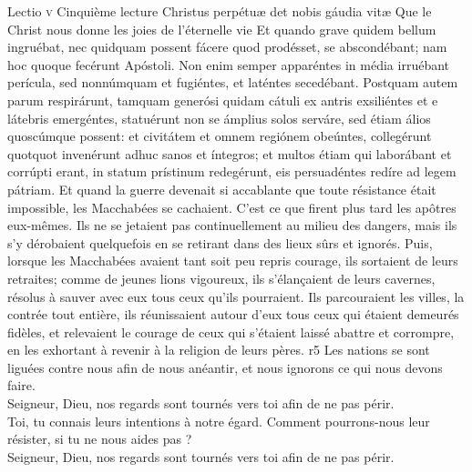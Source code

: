 \documentclass[twoside]{article}
\begin{document}
\begin{paracol}[1]{2}
\lectioresponsorium
	{Lectio \textsc{v}}
	{Cinquième lecture}
	{Christus perpétuæ det nobis gáudia vitæ}
	{Que le Christ nous donne les joies de l'éternelle vie}
	{
		Et quando grave quidem bellum ingruébat, nec quidquam possent fácere quod prodésset, se abscondébant; nam hoc quoque fecérunt Apóstoli. Non enim semper apparéntes in média irruébant perícula, sed nonnúmquam et fugiéntes, et laténtes secedébant. Postquam autem parum respirárunt, tamquam generósi quidam cátuli ex antris exsiliéntes et e látebris emergéntes, statuérunt non se ámplius solos serváre, sed étiam álios quoscúmque possent: et civitátem et omnem regiónem obeúntes, collegérunt quotquot invenérunt adhuc sanos et íntegros; et multos étiam qui laborábant et corrúpti erant, in statum prístinum redegérunt, eis persuadéntes redíre ad legem pátriam.
	}
	{Et quand la guerre devenait si accablante que toute résistance était impossible, les Macchabées se cachaient. C'est ce que firent plus tard les apôtres eux-mêmes. Ils ne se jetaient pas continuellement au milieu des dangers, mais ils s'y dérobaient quelquefois en se retirant dans des lieux sûrs et ignorés. Puis, lorsque les Macchabées avaient tant soit peu repris courage, ils sortaient de leurs retraites; comme de jeunes lions vigoureux, ils s'élançaient de leurs cavernes, résolus à sauver avec eux tous ceux qu'ils pourraient. Ils parcouraient les villes, la contrée tout entière, ils réunissaient autour d'eux tous ceux qui étaient demeurés fidèles, et relevaient le courage de ceux qui s'étaient laissé abattre et corrompre, en les exhortant à revenir à la religion de leurs pères.}
	{r5}
	{\vfill
	\rr Les nations se sont liguées contre nous afin de nous anéantir, et nous ignorons ce qui nous devons faire.\\
	\GreSpecial{*} Seigneur, Dieu, nos regards sont tournés vers toi afin de ne pas périr.\\
	\vv Toi, tu connais leurs intentions à notre égard. Comment pourrons-nous leur résister, si tu ne nous aides pas ?\\
	\GreSpecial{*} Seigneur, Dieu, nos regards sont tournés vers toi afin de ne pas périr.
	\vfill}
	

\end{paracol}
\end{document}
